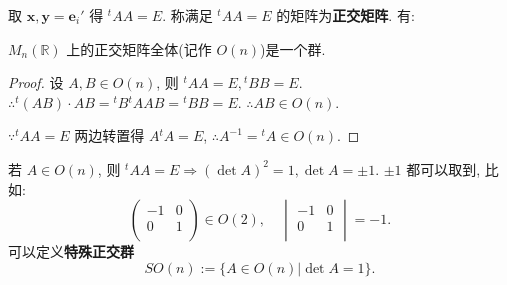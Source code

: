 \documentclass[color=black,device=normal,lang=cn,mode=geye]{elegantnote}
\begin{document}
取 $\boldsymbol{x},\boldsymbol{y}=\boldsymbol{e}_i'$ 得 ${}^tAA=E$. 称满足 ${}^tAA=E$ 的矩阵为\textbf{正交矩阵}. 有:
\begin{theorem}\label{t1.3}
    $M_n(\mathbb{R})$ 上的正交矩阵全体(记作 $O(n)$)是一个群.
\end{theorem}
\begin{proof}
    设 $A,B\in O(n)$, 则 ${}^tAA=E,{}^tBB=E$. $\therefore{}^t(AB)\cdot AB={}^tB{}^tAAB={}^tBB=E$. $\therefore AB\in O(n)$.

    $\because{}^tAA=E$ 两边转置得 $A{}^tA=E$, $\therefore A^{-1}={}^tA\in O(n)$.
\end{proof}
若 $A\in O(n)$, 则 ${}^tAA=E\Rightarrow(\det A)^2=1,\det A=\pm1$. $\pm1$ 都可以取到, 比如:
\[\begin{pmatrix}
    -1 & 0 \\
    0 & 1 \\
\end{pmatrix}\in O(2),\quad\begin{vmatrix}
    -1 & 0 \\
    0 & 1 \\
\end{vmatrix}=-1.\]
可以定义\textbf{特殊正交群}
\[SO(n):=\{A\in O(n)|\det A=1\}.\]
\end{document}
